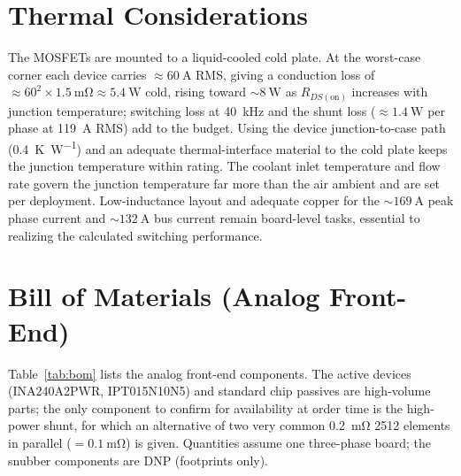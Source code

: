 \documentclass[journal,onecolumn,11pt]{IEEEtran}
\newcommand{\Rdson}{R_{DS(\mathrm{on})}}
\begin{document}
\section{Thermal Considerations}\label{sec:thermal}

The MOSFETs are mounted to a liquid-cooled cold plate. At the worst-case corner each device carries
$\approx\SI{60}{\ampere}$ RMS, giving a conduction loss of
$\approx 60^2\times\SI{1.5}{\milli\ohm}\approx\SI{5.4}{\watt}$ cold, rising toward $\sim\SI{8}{\watt}$
as $\Rdson$ increases with junction temperature; switching loss at \SI{40}{\kilo\hertz} and the
shunt loss ($\approx\SI{1.4}{\watt}$ per phase at \SI{119}{\ampere} RMS) add to the budget. Using the
device junction-to-case path (\SI{0.4}{\kelvin\per\watt}) and an adequate thermal-interface material
to the cold plate keeps the junction temperature within rating. The coolant inlet temperature and
flow rate govern the junction temperature far more than the air ambient and are set per deployment.
Low-inductance layout and adequate copper for the $\sim\SI{169}{\ampere}$ peak phase current and
$\sim\SI{132}{\ampere}$ bus current remain board-level tasks, essential to realizing the calculated
switching performance.

\section{Bill of Materials (Analog Front-End)}\label{sec:bom}

Table~\ref{tab:bom} lists the analog front-end components. The active devices (INA240A2PWR,
IPT015N10N5) and standard chip passives are high-volume parts; the only component to confirm for
availability at order time is the high-power shunt, for which an alternative of two very common
\SI{0.2}{\milli\ohm} 2512 elements in parallel ($=\SI{0.1}{\milli\ohm}$) is given. Quantities assume
one three-phase board; the snubber components are DNP (footprints only).
\end{document}
